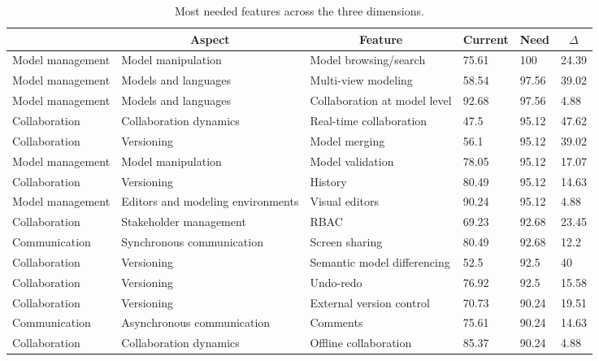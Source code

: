 
  \begin{table*}[]
  \centering
  \notsotiny
  \caption{ Most needed features across the three dimensions.}
\label{tab:most-needed}
\begin{tabular}{|l|l|l|l|l|l|}
  \hline
  \rowcolor[HTML]{C0C0C0}
    \multicolumn{1}{|c|}{Dimension} & \multicolumn{1}{c|}{Aspect} & \multicolumn{1}{c|}{Feature} & \multicolumn{1}{c|}{Current} & \multicolumn{1}{c|}{Need} & \multicolumn{1}{c|}{$\Delta$} \\ \hline
    Model management & Model manipulation & Model browsing/search & 75.61 & 100 & 24.39 \\ \hline 
Model management & Models and languages & Multi-view modeling & 58.54 & 97.56 & 39.02 \\ \hline 
Model management & Models and languages & Collaboration at model level & 92.68 & 97.56 & 4.88 \\ \hline 
Collaboration & Collaboration dynamics & Real-time collaboration & 47.5 & 95.12 & 47.62 \\ \hline 
Collaboration & Versioning & Model merging & 56.1 & 95.12 & 39.02 \\ \hline 
Model management & Model manipulation & Model validation & 78.05 & 95.12 & 17.07 \\ \hline 
Collaboration & Versioning & History & 80.49 & 95.12 & 14.63 \\ \hline 
Model management & Editors and modeling environments & Visual editors & 90.24 & 95.12 & 4.88 \\ \hline 
Collaboration & Stakeholder management & RBAC & 69.23 & 92.68 & 23.45 \\ \hline 
Communication & Synchronous communication & Screen sharing & 80.49 & 92.68 & 12.2 \\ \hline 
Collaboration & Versioning & Semantic model differencing & 52.5 & 92.5 & 40 \\ \hline 
Collaboration & Versioning & Undo-redo & 76.92 & 92.5 & 15.58 \\ \hline 
Collaboration & Versioning & External version control & 70.73 & 90.24 & 19.51 \\ \hline 
Communication & Asynchronous communication & Comments & 75.61 & 90.24 & 14.63 \\ \hline 
Collaboration & Collaboration dynamics & Offline collaboration & 85.37 & 90.24 & 4.88 \\ \hline 

\end{tabular}
\end{table*}
